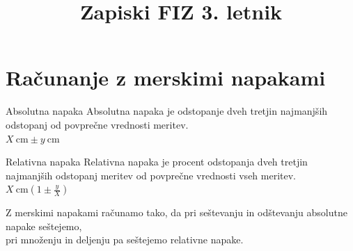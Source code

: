 \documentclass{article}
\title{Zapiski FIZ 3. letnik}
\author{}
\date{}
\begin{document}
\maketitle

\section{Računanje z merskimi napakami}
\begin{defbox}{Absolutna napaka}
    \centering
    Absolutna napaka je odstopanje dveh tretjin najmanjših odstopanj od povprečne vrednosti meritev. \\
    \Large $X\ \mathrm{cm} \pm y\ \mathrm{cm}$
\end{defbox}
\begin{defbox}{Relativna napaka}
    \centering{}
    Relativna napaka je procent odstopanja dveh tretjin najmanjših odstopanj meritev od povprečne vrednosti vseh meritev. \\
    \Large $X\ \mathrm{cm}(1 \pm \frac{y}{X})$
\end{defbox}
\centering
Z merskimi napakami računamo tako, da pri seštevanju in odštevanju absolutne napake seštejemo,\\
pri množenju in deljenju pa seštejemo relativne napake.
\end{document}
